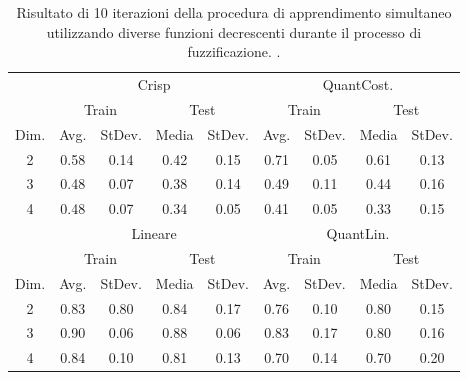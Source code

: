 \documentclass [11pt,a4paper,twoside,openright] {book}
\begin{document}
\begin{table}[!tb]
\caption{Risultato di 10 iterazioni della procedura di apprendimento simultaneo utilizzando diverse funzioni decrescenti durante il processo di fuzzificazione. \label{df}.}
\begin{tabular}{|c|c|c|c|c|c|c|c|c|}
\hline
& \multicolumn{4}{|c|}{Crisp} & \multicolumn{4}{|c|}{QuantCost.}\\
\cline{2-9}
& \multicolumn{2}{|c|}{Train} & \multicolumn{2}{|c|}{Test} & \multicolumn{2}{|c|}{Train} & \multicolumn{2}{|c|}{Test}\\
\hline
Dim. & Avg. & StDev. & Media & StDev. & Avg. & StDev. & Media & StDev. \\
\hline
2 & 0.58 & 0.14 & 0.42 & 0.15 & 0.71 & 0.05 & 0.61 & 0.13 \\
3 & 0.48 & 0.07 & 0.38 & 0.14 & 0.49 & 0.11 & 0.44 & 0.16 \\
4 & 0.48 & 0.07 & 0.34 & 0.05 & 0.41 & 0.05 & 0.33 & 0.15 \\
\hline
\hline
& \multicolumn{4}{|c|}{Lineare} & \multicolumn{4}{|c|}{QuantLin.}\\
\cline{2-9}
& \multicolumn{2}{|c|}{Train} & \multicolumn{2}{|c|}{Test} & \multicolumn{2}{|c|}{Train} & \multicolumn{2}{|c|}{Test}\\
\hline
Dim. & Avg. & StDev. & Media & StDev. & Avg. & StDev. & Media & StDev. \\
\hline
2 & 0.83 & 0.80 & 0.84 & 0.17 & 0.76 & 0.10 & 0.80 & 0.15 \\
3 & 0.90 & 0.06 & 0.88 & 0.06 & 0.83 & 0.17 & 0.80 & 0.16 \\
4 & 0.84 & 0.10 & 0.81 & 0.13 & 0.70 & 0.14 & 0.70 & 0.20 \\
\hline
\end{tabular}
\end{table}
\end{document}
